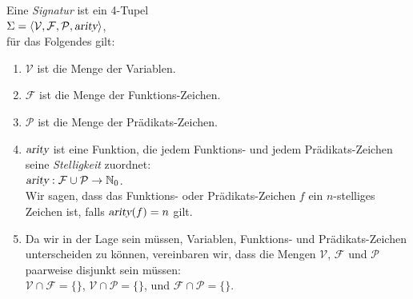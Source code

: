 \begin{Definition}[Signatur]
  Eine \emph{Signatur} ist ein 4-Tupel \\[0.2cm]
  \hspace*{1.3cm} $\Sigma = \langle \mathcal{V}, \mathcal{F}, \mathcal{P}, \textsl{arity} \rangle$, \\[0.2cm]
  f\"{u}r das Folgendes gilt: 
  \begin{enumerate}
  \item $\mathcal{V}$ ist die Menge der Variablen.
  \item $\mathcal{F}$ ist die Menge der Funktions-Zeichen.
  \item $\mathcal{P}$ ist die Menge der Pr\"{a}dikats-Zeichen.
  \item $\textsl{arity}$ ist eine Funktion, die jedem Funktions- und jedem Pr\"{a}dikats-Zeichen seine
        \emph{Stelligkeit} zuordnet: \\[0.2cm]
        \hspace*{1.3cm} $\textsl{arity}: \mathcal{F} \cup \mathcal{P} \rightarrow \mathbb{N}_0$. \\[0.2cm]
        Wir sagen, dass das Funktions- oder Pr\"{a}dikats-Zeichen $f$ ein
        $n$-stelliges Zeichen ist, falls $\textsl{arity}(f) = n$ gilt.
  \item Da wir in der Lage sein m\"{u}ssen, Variablen, Funktions- und Pr\"{a}dikats-Zeichen
        unterscheiden zu k\"{o}nnen, vereinbaren wir, dass die Mengen $\mathcal{V}$,
        $\mathcal{F}$ und $\mathcal{P}$ paarweise disjunkt sein m\"{u}ssen: \\[0.2cm] 
        \hspace*{1.3cm} $\mathcal{V} \cap \mathcal{F} = \{\}$, \quad
                        $\mathcal{V} \cap \mathcal{P} = \{\}$, \quad und \quad
                        $\mathcal{F} \cap \mathcal{P} = \{\}$. \eox
  \end{enumerate}
\end{Definition}

